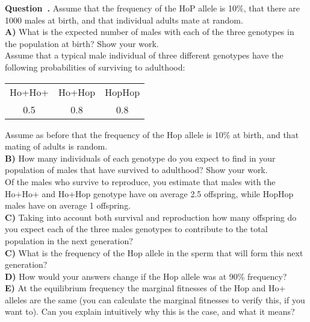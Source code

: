 \documentclass[12pt]{article}
\newcounter{question}[section]   %
\newenvironment{question}[1][]{\refstepcounter{question}\par\medskip
   \textbf{Question~\thequestion. #1} \rmfamily}{\medskip}
\begin{document}
\begin{question}
Assume that the frequency of the HoP allele is 10\%, that there are 1000 males at birth, and that individual adults mate at random.\\
{\bf A)} What is the expected number of males with each of the three genotypes in the population at birth? Show your work.\\

Assume that a typical male individual of three different genotypes
have the following probabilities of surviving to adulthood:\\
\begin{center}
\begin{tabular}{ccc}
Ho+Ho+  &	Ho+Hop 	&HopHop\\
0.5	&	0.8	&	0.8\\
\end{tabular}
\end{center}
Assume as before that the frequency of the Hop allele is 10\% at birth, and that mating of adults is random.  \\
{\bf B)} How many individuals of each genotype do you expect to find in your population of males that have survived to adulthood? Show your work.\\


Of the males who survive to reproduce, you estimate that males with the Ho+Ho+  and Ho+Hop  genotype have on average 2.5 offspring, while HopHop males have on average 1 offspring. \\

{\bf C)} Taking into account both survival and reproduction how many
offspring do you expect each of the three males genotypes to contribute to the total population in the next generation? \\

{\bf C)} What is the frequency of the Hop allele in the sperm that will form this next generation?  \\

{\bf D)}  How would your answers change if the Hop allele was at 90\% frequency? \\

{\bf E)} At the equilibrium frequency the marginal fitnesses of the Hop and Ho+ alleles are the same (you can calculate the marginal fitnesses to verify this, if you want to). Can you explain intuitively why this is the case, and what it means?\\
\end{question}
\end{document}
